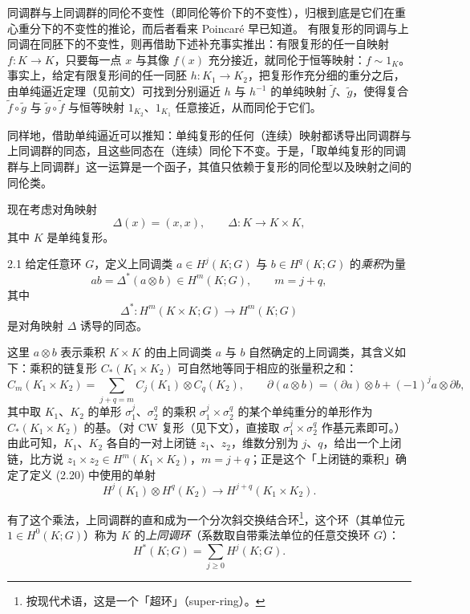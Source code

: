 同调群与上同调群的同伦不变性（即同伦等价下的不变性），归根到底是它们在重心重分下的不变性的推论，而后者看来 Poincaré 早已知道。
有限复形的同调与上同调在同胚下的不变性，则再借助下述补充事实推出：有限复形的任一自映射 $f: K\to K$，只要每一点 $x$ 与其像 $f(x)$ 充分接近，就同伦于恒等映射：$f\sim 1_K$。事实上，给定有限复形间的任一同胚 $h: K_1\to K_2$，把复形作充分细的重分之后，由单纯逼近定理（见前文）可找到分别逼近 $h$ 与 $h^{-1}$ 的单纯映射 $\tilde{f}$、$\tilde{g}$，使得复合 $\tilde{f}\circ\tilde{g}$ 与 $\tilde{g}\circ\tilde{f}$ 与恒等映射 $1_{K_2}$、$1_{K_1}$ 任意接近，从而同伦于它们。

同样地，借助单纯逼近可以推知：单纯复形的任何（连续）映射都诱导出同调群与上同调群的同态，且这些同态在（连续）同伦下不变。于是，「取单纯复形的同调群与上同调群」这一运算是一个函子，其值只依赖于复形的同伦型以及映射之间的同伦类。

现在考虑对角映射
\[
  \Delta(x)=(x,x),\qquad \Delta: K\to K\times K,
\]
其中 $K$ 是单纯复形。

\begin{definition*}{2.1}
给定任意环 $G$，定义上同调类 $a\in H^j(K;G)$ 与 $b\in H^q(K;G)$ 的\emph{乘积}为量
\begin{equation}
  ab=\Delta^*(a\otimes b)\in H^m(K;G),\qquad m=j+q, \tag{2.20}
\end{equation}
其中
\[
  \Delta^*: H^m(K\times K;G)\to H^m(K;G)
\]
是对角映射 $\Delta$ 诱导的同态。
\end{definition*}

这里 $a\otimes b$ 表示乘积 $K\times K$ 的由上同调类 $a$ 与 $b$ 自然确定的上同调类，其含义如下：乘积的链复形 $C_*(K_1\times K_2)$ 可自然地等同于相应的张量积之和：
\begin{equation}
  C_m(K_1\times K_2)=\sum_{j+q=m}C_j(K_1)\otimes C_q(K_2),\qquad
  \partial(a\otimes b)=(\partial a)\otimes b+(-1)^j a\otimes\partial b, \tag{2.21}
\end{equation}
其中取 $K_1$、$K_2$ 的单形 $\sigma_1^j$、$\sigma_2^q$ 的乘积 $\sigma_1^j\times\sigma_2^q$ 的某个单纯重分的单形作为 $C_*(K_1\times K_2)$ 的基。（对 CW 复形（见下文），直接取 $\sigma_1^j\times\sigma_2^q$ 作基元素即可。）由此可知，$K_1$、$K_2$ 各自的一对上闭链 $z_1$、$z_2$，维数分别为 $j$、$q$，给出一个上闭链，比方说 $z_1\times z_2\in H^m(K_1\times K_2)$，$m=j+q$；正是这个「上闭链的乘积」确定了定义 (2.20) 中使用的单射
\[
  H^j(K_1)\otimes H^q(K_2)\longrightarrow H^{j+q}(K_1\times K_2).
\]

有了这个乘法，上同调群的直和成为一个分次斜交换结合环\footnote{按现代术语，这是一个「超环」（super-ring）。}，这个环（其单位元 $1\in H^0(K;G)$）称为 $K$ 的\emph{上同调环}（系数取自带乘法单位的任意交换环 $G$）：
\begin{equation}
  H^*(K;G)=\sum_{j\ge 0}H^j(K;G). \tag{2.22}
\end{equation}

